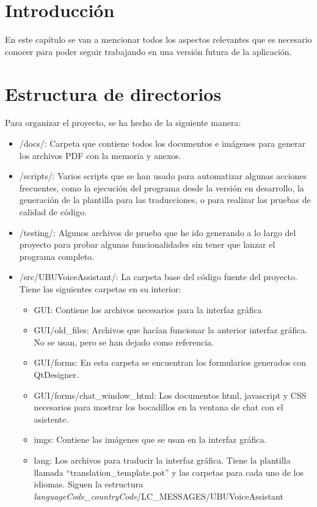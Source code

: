 
\section{Introducción}
En este capítulo se van a mencionar todos los aspectos relevantes que es necesario conocer para poder seguir trabajando en una versión futura de la aplicación.

\section{Estructura de directorios}
Para organizar el proyecto, se ha hecho de la siguiente manera:
\begin{itemize}
    \item /docs/: Carpeta que contiene todos los documentos e imágenes para generar los archivos PDF con la memoria y anexos.
    \item /scripts/: Varios scripts que se han usado para automatizar algunas acciones frecuentes, como la ejecución del programa desde la versión en desarrollo, la generación de la plantilla para las traducciones, o para realizar las pruebas de calidad de código.
    \item /testing/: Algunos archivos de prueba que he ido generando a lo largo del proyecto para probar algunas funcionalidades sin tener que lanzar el programa completo.
    \item /src/UBUVoiceAssistant/: La carpeta base del código fuente del proyecto. Tiene las siguientes carpetas en su interior:
    \begin{itemize}
        \item GUI: Contiene los archivos necesarios para la interfaz gráfica
        \item GUI/old\_files: Archivos que hacían funcionar la anterior interfaz gráfica. No se usan, pero se han dejado como referencia.
        \item GUI/forms: En esta carpeta se encuentran los formularios generados con QtDesigner.
        \item GUI/forms/chat\_window\_html: Los documentos html, javascript y CSS necesarios para mostrar los bocadillos en la ventana de chat con el asistente.
        \item imgs: Contiene las imágenes que se usan en la interfaz gráfica.
        \item lang: Los archivos para traducir la interfaz gráfica. Tiene la plantilla llamada ``translation\_template.pot'' y las carpetas para cada uno de los idiomas. Siguen la estructura \textit{languageCode\_countryCode}/LC\_MESSAGES/UBUVoiceAssistant

\end{itemize}
\end{itemize}
